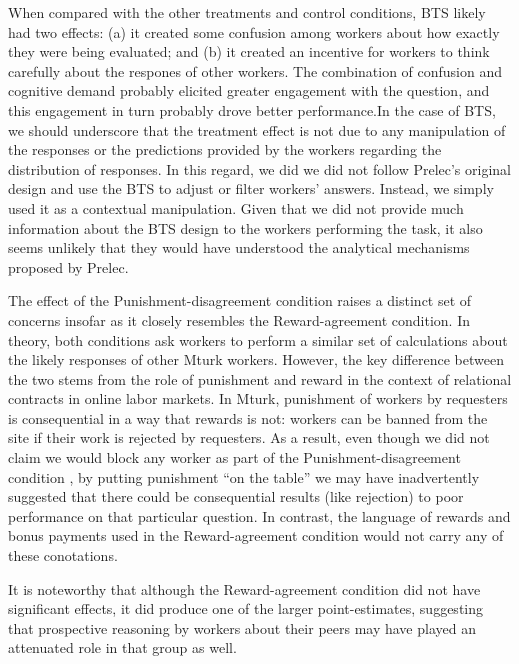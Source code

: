 \documentclass{chi2009}
\begin{document}
When compared with the other treatments and control conditions, BTS
likely had two effects: (a) it created some confusion among workers
about how exactly they were being evaluated; and (b) it created an
incentive for workers to think carefully about the respones of other
workers. The combination of confusion and cognitive demand probably
elicited greater engagement with the question, and this engagement in
turn probably drove better performance.In the case of BTS, we should
underscore that the treatment effect is not due to any manipulation of
the responses or the predictions provided by the workers regarding the
distribution of responses. In this regard, we did we did not follow
Prelec's original design and use the BTS to adjust or filter workers'
answers.\cite{prelec_bts_2004} Instead, we simply used it as a
contextual manipulation. Given that we did not provide much
information about the BTS design to the workers performing the task,
it also seems unlikely that they would have understood the analytical
mechanisms proposed by Prelec.

The effect of the Punishment-disagreement condition raises a distinct
set of concerns insofar as it closely resembles the Reward-agreement
condition. In theory, both conditions ask workers to perform a similar
set of calculations about the likely responses of other Mturk
workers. However, the key difference between the two stems from the
role of punishment and reward in the context of relational contracts in
online labor markets. In Mturk, punishment of workers by requesters is
consequential in a way that rewards is not: workers can be banned from
the site if their work is rejected by requesters. As a result, even
though we did not claim we would block any worker as part of the
Punishment-disagreement condition , by putting punishment ``on the
table''  we may have inadvertently suggested that there could be
consequential results (like rejection) to poor performance on that particular
question. In contrast, the language of rewards and bonus payments used
in the Reward-agreement condition would not carry any of these
conotations.
 
It is noteworthy that although the Reward-agreement condition did not
have significant effects, it did produce one of the larger
point-estimates, suggesting that prospective reasoning by
workers about their peers may have played an attenuated role in that
group as well.
\end{document}
